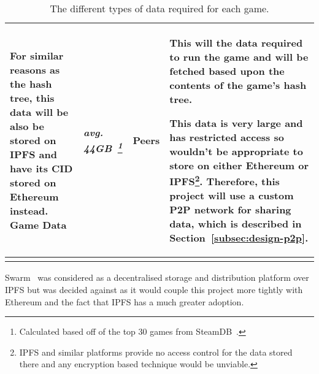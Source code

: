 \begin{longtable}{ p{} p{} p{} p{} }
  \vspace{1mm}
  \small For similar reasons as the hash tree, this data will be also be stored on IPFS and have its CID stored on Ethereum instead.
  \x
  Game Data
  & \textit{avg. 44GB~\footnote{Calculated based off of the top 30 games from SteamDB~\cite{noauthor_steam_nodate}.}}
  & Peers
  & This will the data required to run the game and will be fetched based upon the contents of the game's hash tree.

  \vspace{1mm}
  \small This data is very large and has restricted access so wouldn't be appropriate to store on either Ethereum or IPFS\footnote{IPFS and similar platforms provide no access control for the data stored there and any encryption based technique would be unviable.}. Therefore, this project will use a custom P2P network for sharing data, which is described in Section~\ref{subsec:design-p2p}.
  \\\bottomrule\bottomrule
  \caption{The different types of data required for each game.}
  \label{tab:data}
\end{longtable}

\noindent 
Swarm~\cite{hartman_swarm_1999} was considered as a decentralised storage and distribution platform over IPFS but was decided against as it would couple this project more tightly with Ethereum and the fact that IPFS has a much greater adoption.